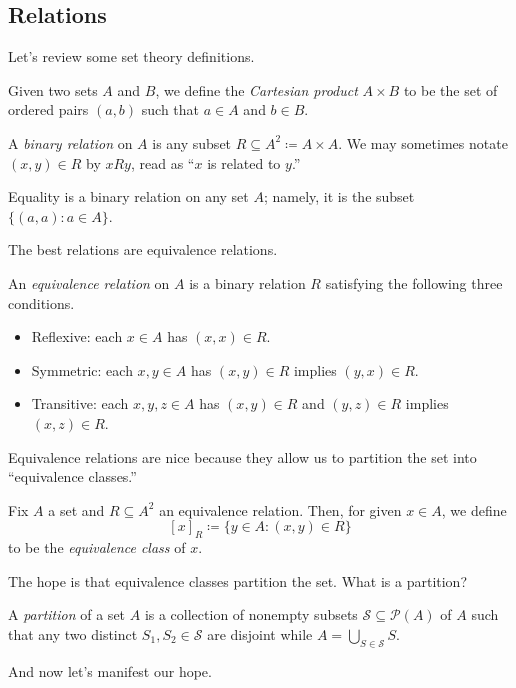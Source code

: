 \documentclass[../notes.tex]{subfiles}
\begin{document}
\subsection{Relations}
Let's review some set theory definitions.
\begin{definition}
	Given two sets $A$ and $B$, we define the \textit{Cartesian product} $A\times B$ to be the set of ordered pairs $(a,b)$ such that $a\in A$ and $b\in B$.
\end{definition}
\begin{definition}
	A \textit{binary relation} on $A$ is any subset $R\subseteq A^2\coloneqq A\times A$. We may sometimes notate $(x,y)\in R$ by $xRy$, read as ``$x$ is related to $y$.''
\end{definition}
\begin{example}
	Equality is a binary relation on any set $A$; namely, it is the subset $\{(a,a):a\in A\}$.
\end{example}
The best relations are equivalence relations.
\begin{definition}
	An \textit{equivalence relation} on $A$ is a binary relation $R$ satisfying the following three conditions.
	\begin{itemize}
		\item Reflexive: each $x\in A$ has $(x,x)\in R$.
		\item Symmetric: each $x,y\in A$ has $(x,y)\in R$ implies $(y,x)\in R$.
		\item Transitive: each $x,y,z\in A$ has $(x,y)\in R$ and $(y,z)\in R$ implies $(x,z)\in R$.
	\end{itemize}
\end{definition}
Equivalence relations are nice because they allow us to partition the set into ``equivalence classes.''
\begin{defi}
	Fix $A$ a set and $R\subseteq A^2$ an equivalence relation. Then, for given $x\in A$, we define
	\[[x]_R\coloneqq \{y\in A:(x,y)\in R\}\]
	to be the \textit{equivalence class} of $x$.
\end{defi}
The hope is that equivalence classes partition the set. What is a partition?
\begin{definition}[Parition]
	A \textit{partition} of a set $A$ is a collection of nonempty subsets $\mathcal S\subseteq\mathcal P(A)$ of $A$ such that any two distinct $S_1,S_2\in\mathcal S$ are disjoint while $A=\bigcup_{S\in\mathcal S}S$.
\end{definition}
And now let's manifest our hope.
\end{document}
